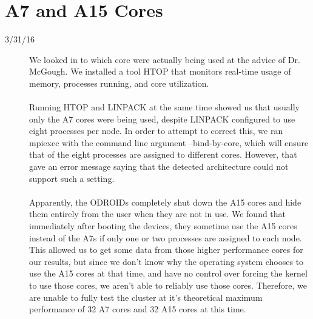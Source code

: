  \section{A7 and A15 Cores}
 \begin{description}
 \item [3/31/16] We looked in to which core were actually being used at the advice of Dr. McGough. We installed a tool HTOP that monitors real-time usage of memory, processes running, and core utilization. \\ \\
Running HTOP and LINPACK at the same time showed us that usually only the A7 cores were being used, despite LINPACK configured to use eight processes per node. In order to attempt to correct this, we ran mpiexec with the command line argument --bind-by-core, which will ensure that of the eight processes are assigned to different cores. However, that gave an error message saying that the detected architecture could not support such a setting. \\ \\
Apparently, the ODROIDs completely shut down the A15 cores and hide them entirely from the user when they are not in use. We found that immediately after booting the devices, they sometime use the A15 cores instead of the A7s if only one or two processes are assigned to each node. This allowed us to get some data from those higher performance cores for our results, but since we don't know why the operating system chooses to use the A15 cores at that time, and have no control over forcing the kernel to use those cores, we aren't able to reliably use those cores. Therefore, we are unable to fully test the cluster at it's theoretical maximum performance of 32 A7 cores and 32 A15 cores at this time.
 \end{description} 
